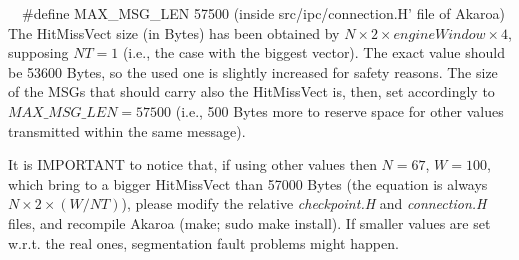 \documentclass[10pt]{article}
\begin{document}
\ \ \#define MAX\_MSG\_LEN 57500 (inside src/ipc/connection.H' file of Akaroa) \\

The HitMissVect size (in Bytes) has been obtained by $N \times 2 \times engineWindow \times 4$, supposing $NT=1$ (i.e., the case with the biggest vector). 
The exact value should be 53600 Bytes, so the used one is slightly increased for safety reasons.
The size of the MSGs that should carry also the HitMissVect is, then, set accordingly to $MAX\_MSG\_LEN=57500$ (i.e., 500 Bytes more to reserve space for other values transmitted within the same message).

It is IMPORTANT to notice that, if using other values then $N=67$, $W=100$, which bring to a bigger HitMissVect than 57000 Bytes (the equation is always $N \times 2 \times (W/NT)$), please modify the relative \emph{checkpoint.H} and \emph{connection.H} files, and recompile Akaroa (make; sudo make install). 
If smaller values are set w.r.t. the real ones, segmentation fault problems might happen.  





\end{document}
